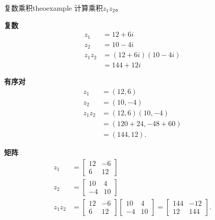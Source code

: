 \begin{myexample}{复数乘积}{theoexample}
计算乘积$z_{1} z_{2}$。

\textbf{复数}
$$
  \begin{aligned}
    z_{1}       & =12+6 i           \\
    z_{2}       & =10-4 i           \\
    z_{1} z_{2} & =(12+6 i)(10-4 i) \\
                & =144+12 i
  \end{aligned}
$$

\textbf{有序对}
$$
  \begin{aligned}
    z_{1}       & =(12,6)          \\
    z_{2}       & =(10,-4)         \\
    z_{1} z_{2} & =(12,6)(10,-4)   \\
                & =(120+24,-48+60) \\
                & =(144,12) .
  \end{aligned}
$$

\textbf{矩阵}
$$
  \begin{aligned}
    z_{1}       & =\left[\begin{array}{cc}
        12 & -6 \\
        6  & 12
      \end{array}\right]                                                                                    \\
    z_{2}       & =\left[\begin{array}{cc}
        10 & 4  \\
        -4 & 10
      \end{array}\right]                                                                                    \\
    z_{1} z_{2} & =\left[\begin{array}{cc}
        12 & -6 \\
        6  & 12
      \end{array}\right]\left[\begin{array}{cc}
        10 & 4  \\
        -4 & 10
      \end{array}\right]=\left[\begin{array}{cc}
        144 & -12 \\
        12  & 144
      \end{array}\right] .
  \end{aligned}
$$
\end{myexample}

